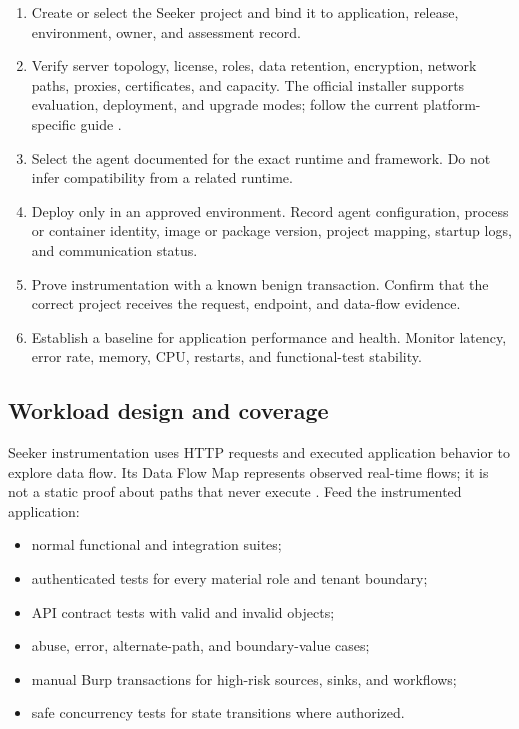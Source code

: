 \documentclass[11pt,letterpaper]{article}
\begin{document}
\begin{enumerate}
  \item Create or select the Seeker project and bind it to application, release, environment, owner, and assessment record.
  \item Verify server topology, license, roles, data retention, encryption, network paths, proxies, certificates, and capacity. The official installer supports evaluation, deployment, and upgrade modes; follow the current platform-specific guide \citep{seekerinstall}.
  \item Select the agent documented for the exact runtime and framework. Do not infer compatibility from a related runtime.
  \item Deploy only in an approved environment. Record agent configuration, process or container identity, image or package version, project mapping, startup logs, and communication status.
  \item Prove instrumentation with a known benign transaction. Confirm that the correct project receives the request, endpoint, and data-flow evidence.
  \item Establish a baseline for application performance and health. Monitor latency, error rate, memory, CPU, restarts, and functional-test stability.
\end{enumerate}

\subsection{Workload design and coverage}

Seeker instrumentation uses HTTP requests and executed application behavior to explore data flow. Its Data Flow Map represents observed real-time flows; it is not a static proof about paths that never execute \citep{seekerinstrumentation,seekerdataflow}. Feed the instrumented application:

\begin{itemize}
  \item normal functional and integration suites;
  \item authenticated tests for every material role and tenant boundary;
  \item API contract tests with valid and invalid objects;
  \item abuse, error, alternate-path, and boundary-value cases;
  \item manual Burp transactions for high-risk sources, sinks, and workflows;
  \item safe concurrency tests for state transitions where authorized.
\end{itemize}
\end{document}
